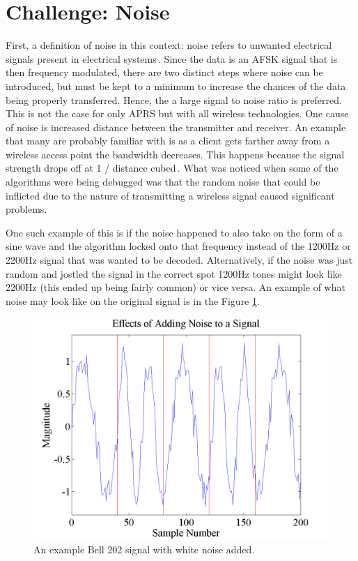 \section{Challenge: Noise}
First, a definition of noise in this context: noise refers to unwanted electrical signals present in electrical systems\,\cite{Sklar1988}. Since the data is an AFSK signal that is then frequency modulated, there are two distinct steps where noise can be introduced, but must be kept to a minimum to increase the chances of the data being properly transferred. Hence, the a large signal to noise ratio is preferred. This is not the case for only APRS but with all wireless technologies. One cause of noise is increased distance between the transmitter and receiver. An example that many are probably familiar with is as a client gets farther away from a wireless access point the bandwidth decreases. This happens because the signal strength drops off at 1 / distance cubed\,\cite{4Gon}. What was noticed when some of the algorithms were being debugged was that the random noise that could be inflicted due to the nature of transmitting a wireless signal caused significant problems.

One such example of this is if the noise happened to also take on the form of a sine wave and the algorithm locked onto that frequency instead of the 1200Hz or 2200Hz signal that was wanted to be decoded. Alternatively, if the noise was just random and jostled the signal in the correct spot 1200Hz tones might look like 2200Hz (this ended up being fairly common) or vice versa. An example of what noise may look like on the original signal is in the Figure \ref{noiseExample}.
\begin{figure}
  \centering
	\includegraphics[width=0.75\linewidth]{images/EffectsofAddingNoisetoaSignal.png} 
	\caption{An example Bell 202 signal with white noise added.}
   \label{noiseExample}
\end{figure}

